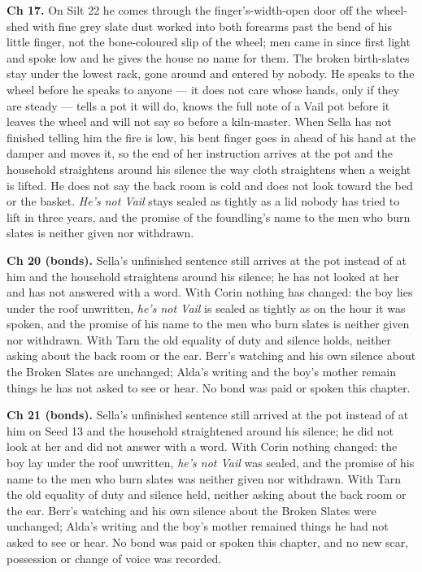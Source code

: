\documentclass{design/chronicle}
\begin{document}
{\textbf{Ch 17.} On Silt 22 he comes through the finger’s-width-open door off the wheel-shed with fine grey slate dust worked into both forearms past the bend of his little finger, not the bone-coloured slip of the wheel; men came in since first light and spoke low and he gives the house no name for them. The broken birth-slates stay under the lowest rack, gone around and entered by nobody. He speaks to the wheel before he speaks to anyone — it does not care whose hands, only if they are steady — tells a pot it will do, knows the full note of a Vail pot before it leaves the wheel and will not say so before a kiln-master. When Sella has not finished telling him the fire is low, his bent finger goes in ahead of his hand at the damper and moves it, so the end of her instruction arrives at the pot and the household straightens around his silence the way cloth straightens when a weight is lifted. He does not say the back room is cold and does not look toward the bed or the basket. \emph{He’s not Vail} stays sealed as tightly as a lid nobody has tried to lift in three years, and the promise of the foundling’s name to the men who burn slates is neither given nor withdrawn.

\textbf{Ch 20 (bonds).} Sella’s unfinished sentence still arrives at the pot instead of at him and the household straightens around his silence; he has not looked at her and has not answered with a word. With Corin nothing has changed: the boy lies under the roof unwritten, \emph{he’s not Vail} is sealed as tightly as on the hour it was spoken, and the promise of his name to the men who burn slates is neither given nor withdrawn. With Tarn the old equality of duty and silence holds, neither asking about the back room or the ear. Berr’s watching and his own silence about the Broken Slates are unchanged; Alda’s writing and the boy’s mother remain things he has not asked to see or hear. No bond was paid or spoken this chapter.

\textbf{Ch 21 (bonds).} Sella’s unfinished sentence still arrived at the pot instead of at him on Seed 13 and the household straightened around his silence; he did not look at her and did not answer with a word. With Corin nothing changed: the boy lay under the roof unwritten, \emph{he’s not Vail} was sealed, and the promise of his name to the men who burn slates was neither given nor withdrawn. With Tarn the old equality of duty and silence held, neither asking about the back room or the ear. Berr’s watching and his own silence about the Broken Slates were unchanged; Alda’s writing and the boy’s mother remained things he had not asked to see or hear. No bond was paid or spoken this chapter, and no new scar, possession or change of voice was recorded.

}
\end{document}
